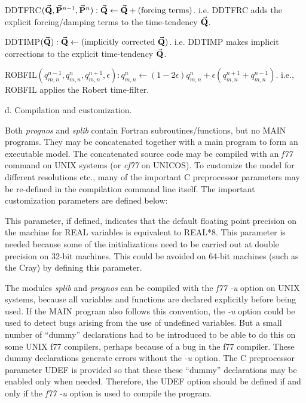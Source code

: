 \litem DDTFRC$({\vec {{\bf Q}}}, {\vec {{\bf P}}}^{n-1}, {\vec {{\bf P}}}^n):
{\vec {{\bf Q}}} \gets {\vec {{\bf Q}}} + (\hbox{forcing terms})$. i.e. DDTFRC adds
the explicit forcing\slash damping terms to the time-tendency ${\vec {{\bf Q}}}$.
 
\litem DDTIMP$({\vec {{\bf Q}}}):{\vec {{\bf Q}}} \gets (\hbox{implicitly corrected }
{\vec {{\bf Q}}})$. i.e. DDTIMP makes implicit corrections to the explicit
time-tendency ${\vec {{\bf Q}}}$.
 
\litem ROBFIL$(q_{m,n}^{n-1},q_{m,n}^n,q_{m,n}^{n+1},\epsilon): q_{m,n}^n
\gets (1 - 2\epsilon)q_{m,n}^n+\epsilon(q_{m,n}^{n+1}+q_{m,n}^{n-1})$. i.e.,
ROBFIL applies the Robert time-filter.
 
 
\Subsection d. Compilation and customization.
 
Both {\it prognos} and {\it splib} contain Fortran subroutines/functions, but
no MAIN programs. They may be concatenated together with a main program to
form an executable model. The concatenated source code may be compiled with an
{\sl f77} command on UNIX systems (or {\sl cf77} on UNICOS). To customize the
model for different resolutions etc., many of the important C preprocessor
parameters may be re-defined in the compilation command line itself. The
important customization parameters are defined below:
 
 This parameter, if defined, indicates that the default
floating point precision on the machine for REAL variables is equivalent to
REAL*8. This parameter is needed because some of the initializations need to
be carried out at double precision on 32-bit machines. This could be avoided
on 64-bit machines (such as the Cray) by defining this parameter.
 
 The modules {\it splib} and {\it prognos} can be compiled with
the {\sl f77 -u} option on UNIX systems, because all variables and functions
are declared explicitly before being used. If the MAIN program also follows
this convention, the {\sl-u} option could be used to detect bugs arising from
the use of undefined variables. But a small number of ``dummy'' declarations
had to be introduced to be able to do this on some UNIX f77 compilers, perhaps
because of a bug in the f77 compiler. These dummy declarations generate errors
without the {\sl-u} option. The C preprocessor parameter UDEF is provided so
that these these ``dummy'' declarations may be enabled only when needed.
Therefore, the UDEF option should be defined if and only if the {\sl f77 -u}
option is used to compile the program.
 
